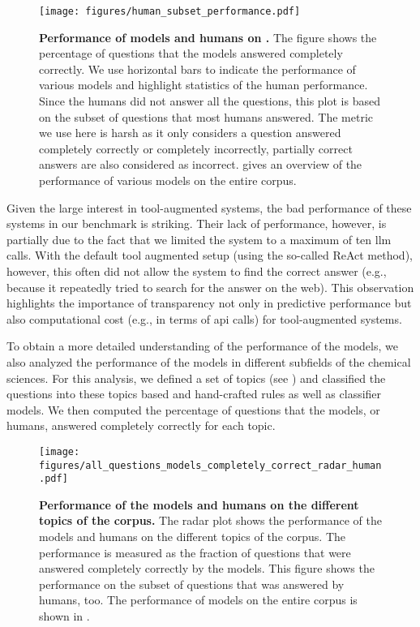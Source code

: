 \documentclass[11pt, oneside]{article}
\begin{document}
\begin{refsection}
\begin{figure}
    \centering
    \texttt{[image: figures/human\_subset\_performance.pdf]}
    \caption{\textbf{Performance of models and humans on \chembench.} The figure shows the percentage of questions that the models answered completely correctly. We use horizontal bars to indicate the performance of various models and highlight statistics of the human performance. 
    Since the humans did not answer all the questions, this plot is based on the subset of questions that most humans answered.
    The metric we use here is harsh as it only considers a question answered completely correctly or completely incorrectly, partially correct answers are also considered as incorrect.
     gives an overview of the performance of various models on the entire corpus.
    }
    \label{fig:human_vs_models_bar}
\end{figure}

Given the large interest in tool-augmented systems, the bad performance of these systems in our benchmark is striking. 
Their lack of performance, however, is partially due to the fact that we limited the system to a maximum of ten \gls{llm} calls.
With the default tool augmented setup (using the so-called ReAct method\autocite{yao2023react}), however, this often did not allow the system to find the correct answer (e.g., because it repeatedly tried to search for the answer on the web).
This observation highlights the importance of transparency not only in predictive performance but also computational cost (e.g., in terms of \gls{api} calls) for tool-augmented systems.


To obtain a more detailed understanding of the performance of the models, we also analyzed the performance of the models in different subfields of the chemical sciences.
For this analysis, we defined a set of topics (see ) and classified the questions into these topics based and hand-crafted rules as well as classifier models.
We then computed the percentage of questions that the models, or humans, answered completely correctly for each topic.

\begin{figure}
    \centering
    \texttt{[image: figures/all\_questions\_models\_completely\_correct\_radar\_human.pdf]}
    \caption{\textbf{Performance of the models and humans on the different topics of the \chembench corpus.} The radar plot shows the performance of the models and humans on the different topics of the \chembench corpus. The performance is measured as the fraction of questions that were answered completely correctly by the models.
    This figure shows the performance on the subset of questions that was answered by humans, too. The performance of models on the entire corpus is shown in .
    }
    \label{fig:all_questions_models_completely_correct_radar_human}
\end{figure}


\end{refsection}
\end{document}
